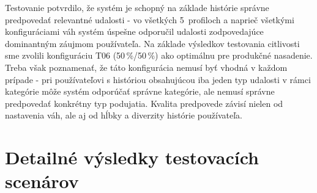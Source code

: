 \documentclass[12pt,a4paper]{article}
\begin{document}
Testovanie potvrdilo, že systém je schopný na základe histórie správne predpovedať
relevantné udalosti - vo všetkých 5~profiloch a naprieč všetkými konfiguráciami
váh systém úspešne odporučil udalosti zodpovedajúce dominantným záujmom
používateľa. Na základe výsledkov testovania citlivosti sme zvolili konfiguráciu
T06 (50\,\%/50\,\%) ako optimálnu pre produkčné nasadenie. Treba však poznamenať,
že táto konfigurácia nemusí byť vhodná v každom prípade - pri používateľovi
s históriou obsahujúcou iba jeden typ udalosti v rámci kategórie môže systém
odporúčať správne kategórie, ale nemusí správne predpovedať konkrétny typ podujatia.
Kvalita predpovede závisí nielen od nastavenia váh, ale aj od hĺbky a diverzity
histórie používateľa.

\newpage
\appendix
\section{Detailné výsledky testovacích scenárov}

\end{document}
